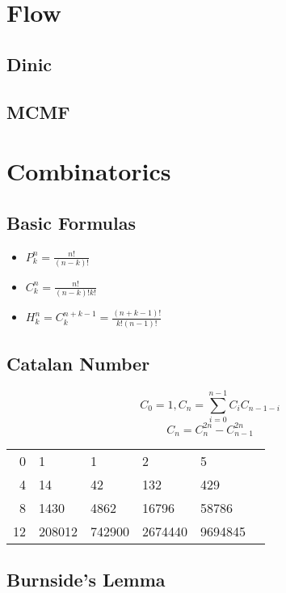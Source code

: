 \documentclass[twocolumn]{article}
\begin{document}
\section{Flow}

\subsection{Dinic}



\subsection{MCMF}



\section{Combinatorics}

\subsection{Basic Formulas}

\begin{itemize}
    \item $P^n_k=\frac{n!}{(n-k)!}$
    \item $C^n_k=\frac{n!}{(n-k)!k!}$
    \item $H^n_k=C^{n+k-1}_k=\frac{(n+k-1)!}{k!(n-1)!}$
\end{itemize}

\subsection{Catalan Number}

$$
C_0=1, C_n=\sum_{i=0}^{n-1} C_i C_{n-1-i}
$$
$$
C_n=C_n^{2n}-C_{n-1}^{2n}
$$
\begin{center}
    \begin{tabular}{r|lllll}
        0 & 1 & 1 & 2 & 5 \\
        4 & 14 & 42 & 132 & 429 \\
        8 & 1430 & 4862 & 16796 & 58786 \\
        12 & 208012 & 742900 & 2674440 & 9694845
    \end{tabular}
\end{center}

\subsection{Burnside's Lemma}
\end{document}
